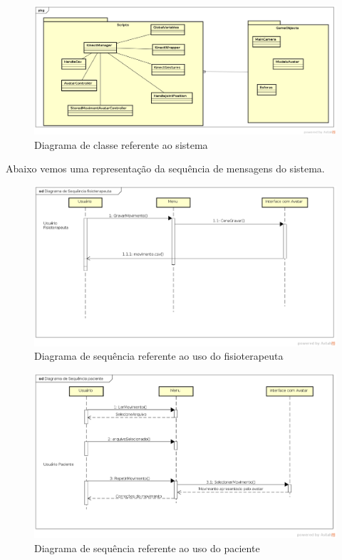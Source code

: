   \begin{figure}[H]
  \centering
  \includegraphics [keepaspectratio=true,scale=0.45]{figuras/DiagramaDeClasse.eps}

  \caption{Diagrama de classe referente ao sistema}
  \label{diagramaClasse}
  \end{figure}

  Abaixo vemos uma representação da sequência de mensagens do sistema.


      \begin{figure}[H]
      \centering
      \includegraphics [keepaspectratio=true,scale=0.45]{figuras/diagramaFisio.eps}

      \caption{Diagrama de sequência referente ao uso do fisioterapeuta}
      \label{diagramaFisio}
      \end{figure}


      \begin{figure}[H]
      \centering
      \includegraphics [keepaspectratio=true,scale=0.45]{figuras/diagramaPaciente.eps}

      \caption{Diagrama de sequência referente ao uso do paciente}
      \label{diagramaPaciente}
      \end{figure}



